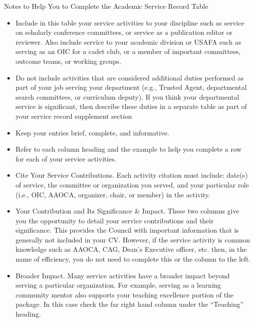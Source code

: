 \documentclass[11pt,titlepage]{article}
\begin{document}
Notes to Help You to Complete the Academic Service Record Table
\begin{itemize}
  \item
  Include in this table your service activities to your discipline such as service on scholarly conference committees, or service as a publication editor or reviewer.
  Also include service to your academic division or USAFA such as serving as an OIC for a cadet club, or a member of important committees, outcome teams, or working groups.

  \item
  Do not include activities that are considered additional duties performed as part of your job serving your department (e.g., Trusted Agent, departmental search committees, or curriculum deputy).
  If you think your departmental service is significant, then describe these duties in a separate table as part of your service record supplement section

  \item
  Keep your entries brief, complete, and informative.

  \item
  Refer to each column heading and the example to help you complete a row for each of your
service activities.

  \item
  Cite Your Service Contributions.
  Each activity citation must include: date(s) of service, the committee or organization you served, and your particular role (i.e., OIC, AAOCA, organizer, chair, or member) in the activity.

  \item
  Your Contribution and Its Significance \& Impact.
  These two columns give you the opportunity to detail your service contributions and their significance.
  This provides the Council with important information that is generally not included in your \gls{CV}.
  However, if the service activity is common knowledge such as AAOCA, CAG, Dean's Executive officer, etc. then, in the name of efficiency, you do not need to complete this or the column to the left.

  \item
  Broader Impact.
  Many service activities have a broader impact beyond serving a particular organization.
  For example, serving as a learning community mentor also supports your teaching excellence portion of the package.
  In this case check the far right hand column under the ``Teaching'' heading.
\end{itemize}



\end{document}
